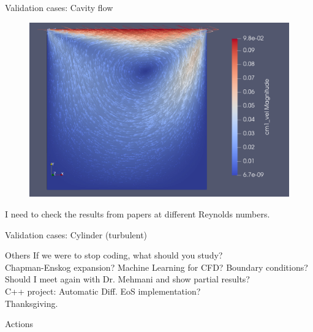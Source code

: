 \documentclass{beamer}
\begin{document}
	\begin{frame}{Validation cases: Cavity flow}
		\begin{figure}
			\includegraphics[scale=0.18]{pics/cavity.png}
		\end{figure}
	I need to check the results from papers at different Reynolds numbers.
	\end{frame}

	\begin{frame}{Validation cases: Cylinder (turbulent)}
		
	\end{frame}

	\begin{frame}{Others}
		If we were to stop coding, what should you study?\\
		Chapman-Enskog expansion? Machine Learning for CFD? Boundary conditions?\\
		Should I meet again with Dr. Mehmani and show partial results?\\
		C++ project: Automatic Diff. EoS implementation?\\
		Thanksgiving.
	\end{frame}

	\begin{frame}{Actions}
		
	\end{frame}
	
	
	
	
\end{document}
